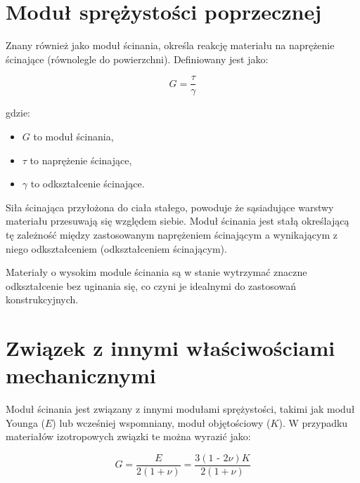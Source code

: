 {}
\justify
\fontsize{14}{16}\selectfont
\setlength{\parindent}{0pt}
\section*{Moduł sprężystości poprzecznej \cite{alma991001031769708832}} 
\label{chap:wstep}
\fontsize{12}{14}\selectfont

\hspace{1.5cm} Znany również jako moduł ścinania, określa reakcję materiału na naprężenie ścinające (równolegle do powierzchni).
Definiowany jest jako:

$$
G = \frac{\tau}{\gamma}
$$

gdzie:
\begin{itemize}
  \item $G$ to moduł ścinania,
  \item $\tau$ to naprężenie ścinające,
  \item $\gamma$ to odkształcenie ścinające.
\end{itemize}

\hspace{1.5cm} Siła ścinająca przyłożona do ciała stałego, powoduje że sąsiadujące warstwy materiału przesuwają się względem siebie. Moduł ścinania jest stałą określającą tę zależność między zastosowanym naprężeniem ścinającym a wynikającym z niego odkształceniem (odkształceniem ścinającym).

Materiały o wysokim module ścinania są w stanie wytrzymać znaczne odkształcenie bez uginania się, co czyni je idealnymi do zastosowań konstrukcyjnych.

{}
\section*{Związek z innymi właściwościami mechanicznymi \cite{alma991000386409708832}}
\vspace{-1.0em}
\label{sec:spacing_font_size}

\hspace{1.5cm} Moduł ścinania jest związany z innymi modułami sprężystości, takimi jak moduł Younga ($E$) lub wcześniej wspomniany, moduł objętościowy ($K$). W przypadku materiałów izotropowych związki te można wyrazić jako:

$$
G = \frac{E}{2(1 + \nu)} = \frac{3(1 \text{ - } 2\nu)K}{2(1 + \nu)}
$$

